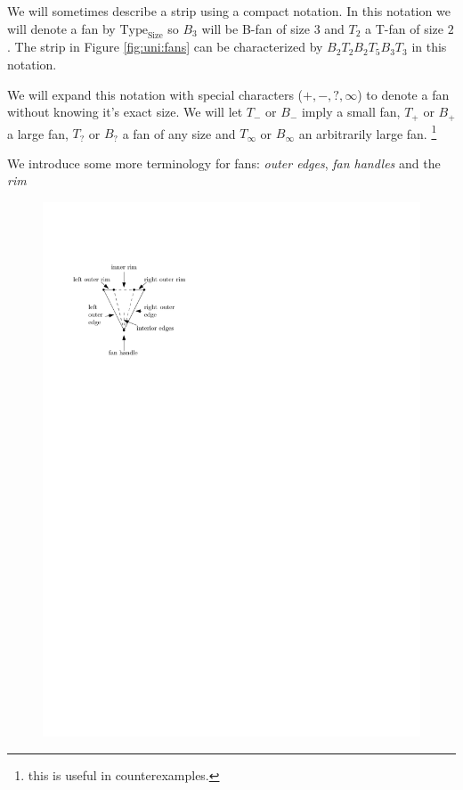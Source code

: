  We will sometimes describe a strip using a compact notation. In this notation we will denote a fan by $\text{Type}_\text{Size}$ so $B_3$ will be B-fan of size $3$ and $T_2$ a T-fan of size $2$. The strip in Figure \ref{fig:uni:fans} can be characterized by $B_2 T_2 B_2 T_5 B_3 T_3$ in this notation.

 We will expand this notation with special characters ($+,-,?, \infty$) to denote a fan without knowing it's exact size.
 We will let $T_-$ or $B_-$ imply a small fan, $T_+$ or $B_+$ a large fan, $T_?$ or $B_?$ a fan of any size and $T_\infty$ or $B_\infty$ an arbitrarily large fan.
 \footnote{this is useful in counterexamples.}




We introduce some more terminology for fans: \emph{outer edges}, \emph{fan handles} and the \emph{rim}
\begin{figure}[h]
  \centering
  \includegraphics[scale=1]{unifiedAlgo/img/fanterms}
  \caption{}
  \label{fig:}
\end{figure}

